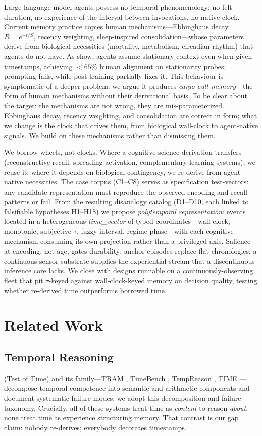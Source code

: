 \documentclass[letterpaper]{article}
\begin{document}
Large language model agents possess no temporal phenomenology: no felt duration, no experience of the interval between invocations, no native clock. Current memory practice copies human mechanisms---Ebbinghaus decay $R=e^{-t/S}$, recency weighting, sleep-inspired consolidation---whose parameters derive from biological necessities (mortality, metabolism, circadian rhythm) that agents do not have. As \citet{cheng2026blind} show, agents assume stationary context even when given timestamps, achieving $<65\%$ human alignment on stationarity probes; prompting fails, while post-training partially fixes it. This behaviour is symptomatic of a deeper problem: we argue it produces \emph{cargo-cult memory}---the form of human mechanisms without their derivational basis. To be clear about the target: the mechanisms are not wrong, they are mis-parameterized. Ebbinghaus decay, recency weighting, and consolidation are correct in form; what we change is the clock that drives them, from biological wall-clock to agent-native signals. We build on these mechanisms rather than dismissing them.

We borrow wheels, not clocks. Where a cognitive-science derivation transfers (reconstructive recall, spreading activation, complementary learning systems), we reuse it; where it depends on biological contingency, we re-derive from agent-native necessities. The case corpus (C1--C8) serves as specification test-vectors: any candidate representation must reproduce the observed encoding-and-recall patterns or fail. From the resulting disanalogy catalog (D1--D10, each linked to falsifiable hypotheses H1--H18) we propose \emph{polytemporal representation}: events located in a heterogeneous \emph{time\_vector} of typed coordinates---wall-clock, monotonic, subjective $\tau$, fuzzy interval, regime phase---with each cognitive mechanism consuming its own projection rather than a privileged axis. Salience at encoding, not age, gates durability; anchor episodes replace flat chronologies; a continuous sensor substrate supplies the experiential stream that a discontinuous inference core lacks. We close with designs runnable on a continuously-observing fleet that pit $\tau$-keyed against wall-clock-keyed memory on decision quality, testing whether re-derived time outperforms borrowed time.

\section{Related Work}
\subsection{Temporal Reasoning}
\citet{fatemi2025tot} (Test of Time) and its family---TRAM \citep{tram2024}, TimeBench \citep{chu2024timebench}, TempReason \citep{tan2023tempreason}, TIME \citep{yuan2025time}---decompose temporal competence into semantic and arithmetic components and document systematic failure modes; we adopt this decomposition and failure taxonomy. Crucially, all of these systems treat time as \emph{content} to reason \emph{about}; none treat time as experience structuring memory. That contrast is our gap claim: nobody re-derives; everybody decorates timestamps.
\end{document}
